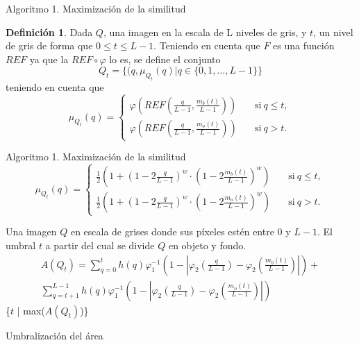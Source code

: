 \documentclass{beamer}
\theoremstyle{plain} %
\theoremstyle{definition}
\newtheorem{defn}{Definición}
\newcommand{\abs}[1]{\left\vert#1\right\vert}
\begin{document}
\begin{frame}{Algoritmo 1. Maximización de la similitud}
\begin{defn}\label{def:conjuntodifusomonoumbral}
Dada $Q$, una imagen en la escala de L niveles de gris, y $t$, un nivel de gris de forma que $0\leq t\leq L-1$. Teniendo en cuenta que $F$ es una función $REF$ ya que la $REF \circ \varphi$ lo es, se define el conjunto
$$Q_t = \{(q, \mu_{Q_t}(q)|q\in \{0,1,\dots, L-1\}\}$$ 
teniendo en cuenta que
$$\mu_{Q_t}(q) = \left\{ \begin{aligned}
     \varphi\left(REF\left(\frac{q}{L-1}, \frac{m_b(t)}{L-1} \right)\right) & \quad\text{si}\ q\leq t,\\
     \varphi\left(REF\left(\frac{q}{L-1}, \frac{m_o(t)}{L-1} \right)\right) & \quad\text{si}\ q> t.
 \end{aligned}\right.$$
 \end{defn}
\end{frame}

\begin{frame}{Algoritmo 1. Maximización de la similitud}
  \begin{equation*} \label{eq:conjdifusosdombimono}
    \mu_{Q_t}(q) = \left\{ \begin{aligned}
         \frac{1}{2}\left(1 + \left(1-2\frac{q}{L-1}\right)^w\cdot\left(1-2\frac{m_b(t)}{L-1}\right)^w\right)& \quad\text{si}\ q\leq t,\\
         \frac{1}{2}\left(1 + \left(1-2\frac{q}{L-1}\right)^w\cdot\left(1-2\frac{m_o(t)}{L-1}\right)^w\right)& \quad\text{si}\ q> t.
     \end{aligned}\right.
\end{equation*}
\end{frame}

\begin{frame}[squeeze]
  \begin{algorithm}[H]%
  \begin{algorithmic}[1]
  \REQUIRE Una imagen $Q$ en escala de grises donde sus píxeles estén entre $0$ y $L-1$.
  \ENSURE El umbral $t$ a partir del cual se divide $Q$ en objeto y fondo.
  \STATE \begin{equation*}\begin{split}
  A(Q_t)= \sum_{q=0}^{t} h(q)\varphi_1^{-1}\left(1-\abs{\varphi_2\left(\frac{q}{L-1}\right)-\varphi_2\left(\frac{m_b(t)}{L-1}\right)}\right) + \\ \sum_{q=t+1}^{L-1} h(q)\varphi_1^{-1}\left(1-\abs{\varphi_2\left(\frac{q}{L-1}\right)-\varphi_2\left(\frac{m_o(t)}{L-1}\right)}\right)
  \end{split}\end{equation*}
  \ENDFOR
  \RETURN \{$t$ | max($A(Q_t)$)\}
  \end{algorithmic}
  \caption{Umbralización del área}\label{alg:algoritmo2}
  \end{algorithm}
\end{frame}
\end{document}
